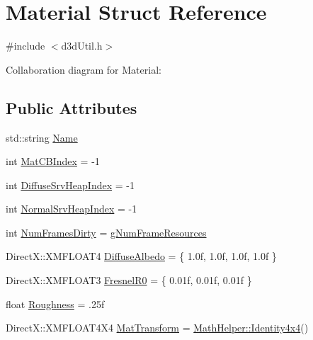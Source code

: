 \hypertarget{struct_material}{}\section{Material Struct Reference}
\label{struct_material}


{\ttfamily \#include $<$d3d\+Util.\+h$>$}



Collaboration diagram for Material\+:
\subsection*{Public Attributes}
\begin{DoxyCompactItemize}
\item 
std\+::string \hyperlink{struct_material_a793dc9034c137caf3d8b3b4b0f9d451b_a793dc9034c137caf3d8b3b4b0f9d451b}{Name}
\item 
int \hyperlink{struct_material_a7bafa2db0678ffe18c5e51f3d0e45df9_a7bafa2db0678ffe18c5e51f3d0e45df9}{Mat\+C\+B\+Index} = -\/1
\item 
int \hyperlink{struct_material_ae0af64dd847942c26368b71faefe747e_ae0af64dd847942c26368b71faefe747e}{Diffuse\+Srv\+Heap\+Index} = -\/1
\item 
int \hyperlink{struct_material_af6139531ff098c78d4d03d2fa232f27e_af6139531ff098c78d4d03d2fa232f27e}{Normal\+Srv\+Heap\+Index} = -\/1
\item 
int \hyperlink{struct_material_aacbebebfe577cd18d8652a01e8fae8c0_aacbebebfe577cd18d8652a01e8fae8c0}{Num\+Frames\+Dirty} = \hyperlink{d3d_util_8h_a7c82b7821d2662eb6e0cfdc08a6c4bd4_a7c82b7821d2662eb6e0cfdc08a6c4bd4}{g\+Num\+Frame\+Resources}
\item 
Direct\+X\+::\+X\+M\+F\+L\+O\+A\+T4 \hyperlink{struct_material_a35fea10a83b154ec1e16d083e2d4e41f_a35fea10a83b154ec1e16d083e2d4e41f}{Diffuse\+Albedo} = \{ 1.\+0f, 1.\+0f, 1.\+0f, 1.\+0f \}
\item 
Direct\+X\+::\+X\+M\+F\+L\+O\+A\+T3 \hyperlink{struct_material_afa0eeacfe7ed75af247eb08edb14d7b8_afa0eeacfe7ed75af247eb08edb14d7b8}{Fresnel\+R0} = \{ 0.\+01f, 0.\+01f, 0.\+01f \}
\item 
float \hyperlink{struct_material_a909d7c43062f35668676364d3873449d_a909d7c43062f35668676364d3873449d}{Roughness} = .\+25f
\item 
Direct\+X\+::\+X\+M\+F\+L\+O\+A\+T4\+X4 \hyperlink{struct_material_a3fd206fc6ecb51634475f22ff17528d0_a3fd206fc6ecb51634475f22ff17528d0}{Mat\+Transform} = \hyperlink{class_math_helper_a68b4e9af95b1a36aad30ea80839f6b19_a68b4e9af95b1a36aad30ea80839f6b19}{Math\+Helper\+::\+Identity4x4}()
\end{DoxyCompactItemize}


